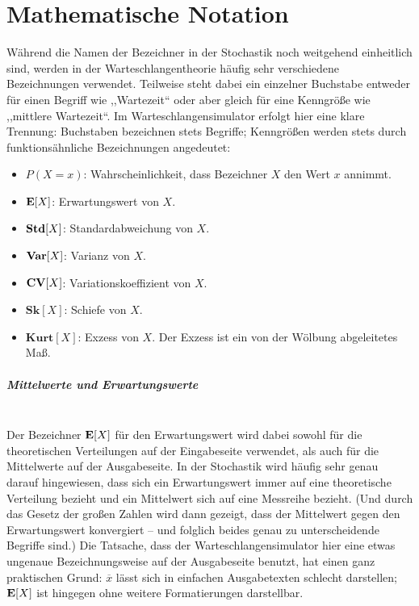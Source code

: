 \documentclass[deutsch]{svmono}
\begin{document}
\chapter{Mathematische Notation}

Während die Namen der Bezeichner in der Stochastik noch weitgehend einheitlich sind, werden in der Warteschlangentheorie häufig sehr verschiedene Bezeichnungen verwendet. Teilweise steht dabei ein einzelner Buchstabe entweder für einen Begriff wie ,,Wartezeit`` oder aber gleich für eine Kenngröße wie ,,mittlere Wartezeit``. Im Warteschlangensimulator erfolgt hier eine klare Trennung: Buchstaben bezeichnen stets Begriffe; Kenngrößen werden stets durch funktionsähnliche Bezeichnungen angedeutet:

\begin{itemize}
\item
$P(X=x)$:
Wahrscheinlichkeit, dass Bezeichner $X$ den Wert $x$ annimmt.
\item
${\bf E}[X]$:
Erwartungswert von $X$.
\item
${\bf Std}[X]$:
Standardabweichung von $X$.
\item
${\bf Var}[X]$:
Varianz von $X$.
\item
${\bf CV}[X]$:
Variationskoeffizient von $X$.
\item
$\mathbf{Sk}[X]$:
Schiefe von $X$.
\item
$\mathbf{Kurt}[X]$:
Exzess von $X$. Der Exzess ist ein von der Wölbung abgeleitetes Maß.
\end{itemize}

\paragraph{Mittelwerte und Erwartungswerte}~\\
Der Bezeichner ${\bf E}[X]$ für den Erwartungswert wird dabei sowohl für die theoretischen Verteilungen auf der Eingabeseite verwendet, als auch für die Mittelwerte auf der Ausgabeseite. In der Stochastik wird häufig sehr genau darauf hingewiesen, dass sich ein Erwartungswert immer auf eine theoretische Verteilung bezieht und ein Mittelwert sich auf eine Messreihe bezieht. (Und durch das Gesetz der großen Zahlen wird dann gezeigt, dass der Mittelwert gegen den Erwartungswert konvergiert -- und folglich beides genau zu unterscheidende Begriffe sind.) Die Tatsache, dass der Warteschlangensimulator hier eine etwas ungenaue Bezeichnungsweise auf der Ausgabeseite benutzt, hat einen ganz praktischen Grund: $\overline{x}$ lässt sich in einfachen Ausgabetexten schlecht darstellen; ${\bf E}[X]$ ist hingegen ohne weitere Formatierungen darstellbar.
\end{document}

